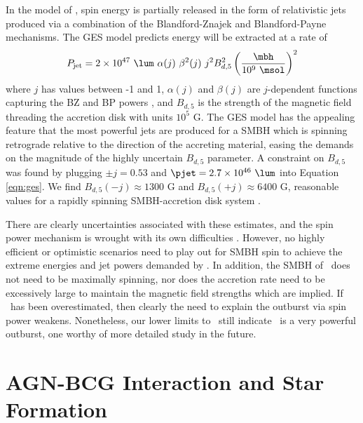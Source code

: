\documentclass[11pt, preprint]{aastex}
\begin{document}
In the model of \citet[][GES hereafter]{gesspin}, spin energy is
partially released in the form of relativistic jets produced via a
combination of the Blandford-Znajek \citep[BZ;][]{bz} and
Blandford-Payne \citep[BP;][]{1982MNRAS.199..883B} mechanisms. The GES
model predicts energy will be extracted at a rate of
\begin{equation}
  P_{\rm{jet}} = 2 \times 10^{47} ~{\lum} ~\alpha(j) ~\beta^2(j) ~j^2
  B_{d,5}^2 \left(\frac{\mbh}{10^9 ~\msol}\right)^2
  \label{eqn:ges}
\end{equation}
where $j$ has values between -1 and 1, $\alpha(j)$ and $\beta(j)$ are
$j$-dependent functions capturing the BZ and BP powers
\citep[see][]{2009ApJ...699L..52G}, and $B_{d,5}$ is the strength of
the magnetic field threading the accretion disk with units $10^5$
G. The GES model has the appealing feature that the most powerful jets
are produced for a SMBH which is spinning retrograde relative to the
direction of the accreting material, easing the demands on the
magnitude of the highly uncertain $B_{d,5}$ parameter. A constraint on
$B_{d,5}$ was found by plugging $\pm j=0.53$ and $\pjet = 2.7 \times
10^{46} ~\lum$ into Equation \ref{eqn:ges}. We find $B_{d,5}(-j)
\approx 1300$ G and $B_{d,5}(+j) \approx 6400$ G, reasonable values
for a rapidly spinning SMBH-accretion disk system
\citep[\eg][]{2002Sci...295.1688K}.

There are clearly uncertainties associated with these estimates, and
the spin power mechanism is wrought with its own difficulties
\citep[see][for thorough discussion]{msspin}. However, no highly
efficient or optimistic scenarios need to play out for SMBH spin to
achieve the extreme energies and jet powers demanded by \rbs. In
addition, the SMBH of \rbs\ does not need to be maximally spinning,
nor does the accretion rate need to be excessively large to maintain
the magnetic field strengths which are implied. If \ecav\ has been
overestimated, then clearly the need to explain the outburst via spin
power weakens. Nonetheless, our lower limits to \ecav\ still indicate
\rbs\ is a very powerful outburst, one worthy of more detailed study
in the future.

\section{AGN-BCG Interaction and Star Formation}
\label{sec:bcg}
\end{document}
